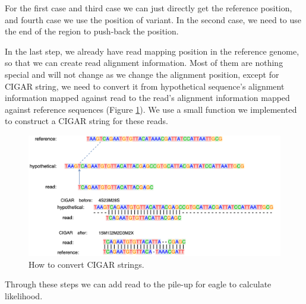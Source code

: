 For the first case and third case we can just directly get the reference position, and fourth case we use the position of variant.  In the second case, we need to use the end of the region to push-back the position.

In the last step, we already have read mapping position in the reference genome, so that we can create read alignment information. Most of them are nothing special and will not change as we change the alignment position, except for CIGAR string, we need to convert it from hypothetical sequence's alignment information mapped against read to the read's alignment information mapped against reference sequences (Figure \ref{convert-CIGAR}).  We use a small function we implemented to construct a CIGAR string for these reads.

\begin{figure}[H]
\includegraphics[width=1\columnwidth]{body/image/convert-CIGAR.png}
\caption[CIGAR strings]{How to convert CIGAR strings.}
\label{convert-CIGAR}
\end{figure}

Through these steps we can add read to the pile-up for eagle to calculate likelihood.

